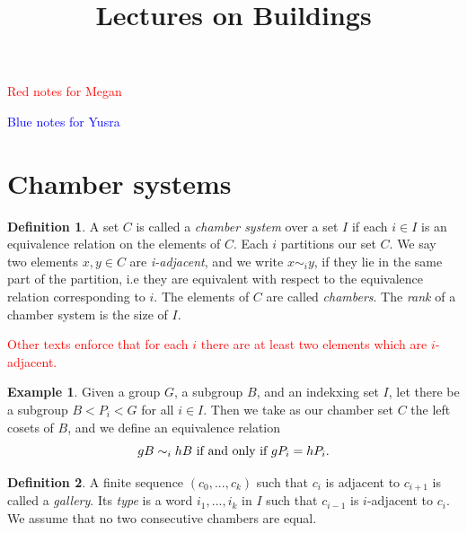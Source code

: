 \documentclass[11pt]{article}
\begin{document}
\newtheorem{theorem}{Theorem}
\theoremstyle{definition}
\newtheorem{definition}{Definition}
\newtheorem{proposition}{Proposition}
\newtheorem{example}{Example}
\newtheorem{lemma}{Lemma}
\newtheorem{corollary}{Corollary}
\newcommand{\uw}{\mathcal{U}(W,X)}
\newcommand{\W}{$(W,S)$}
\newcommand{\ix}{\textit}
\newcommand{\tr}{\textcolor{red}}
\newcommand{\sg}{$\Sigma$}


\title{Lectures on Buildings}
\maketitle
\tableofcontents 





\textcolor{red}{Red notes for Megan}

\textcolor{blue}{Blue notes for Yusra}

\section{Chamber systems}

\begin{definition}
    A set $C$ is called a \ix{chamber system} over a set $I$ if each $i\in I$ is an equivalence relation on the elements of $C$. Each $i$ partitions our set $C$. We say two elements $x,y\in C$ are \ix{i-adjacent}, and we write $x\sim_{i} y$, if they lie in the same part of the partition, i.e they are equivalent with respect to the equivalence relation corresponding to $i$. The elements of $C$ are called \ix{chambers}. The \ix{rank} of a chamber system is the size of $I$. 
\end{definition}


\tr{Other texts enforce that for each $i$ there are at least two elements which are $i$-adjacent.}


\begin{example}
    Given a group $G$, a subgroup $B$, and an indekxing set $I$, let there be a subgroup $B<P_i<G$ for all $i\in I$. Then we take as our chamber set $C$ the left cosets of $B$, and we define an equivalence relation
    \[gB\sim_{i}hB \textnormal{ if and only if }gP_i=hP_i.\]
\end{example}

\begin{definition}
    A finite sequence $(c_0,...,c_k)$ such that $c_i$ is adjacent to $c_{i+1}$ is called a \ix{gallery}. Its \ix{type} is a word $i_1,...,i_k$ in $I$ such that  $c_{i-1}$ is $i$-adjacent to $c_{i}$. We assume that no two consecutive chambers are equal.
\end{definition}
\end{document}
